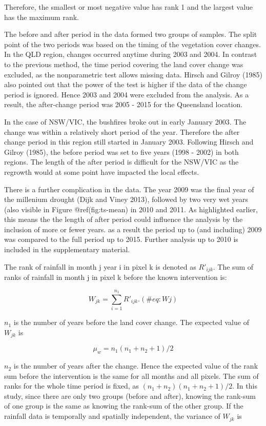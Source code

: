 \documentclass[fleqn,10pt,lineno]{wlpeerj} %
\begin{document}
\noindent Therefore, the smallest or most negative value has rank 1 and
the largest value has the maximum rank.

The before and after period in the data formed two groups of samples.
The split point of the two periods was based on the timing of the
vegetation cover changes. In the QLD region, changes occurred anytime
during 2003 and 2004. In contrast to the previous method, the time
period covering the land cover change was excluded, as the nonparametric
test allows missing data. Hirsch and Gilroy (1985) also pointed out that
the power of the test is higher if the data of the change period is
ignored. Hence 2003 and 2004 were excluded from the analysis. As a
result, the after-change period was 2005 - 2015 for the Queensland
location.

In the case of NSW/VIC, the bushfires broke out in early January 2003.
The change was within a relatively short period of the year. Therefore
the after change period in this region still started in January 2003.
Following Hirsch and Gilroy (1985), the before period was set to five
years (1998 - 2002) in both regions. The length of the after period is
difficult for the NSW/VIC as the regrowth would at some point have
impacted the local effects.

There is a further complication in the data. The year 2009 was the final
year of the millenium drought (Dijk and Viney 2013), followed by two
very wet years (also visible in Figure @ref(fig:ts-mean) in 2010 and
2011. As highlighted earlier, this means the the length of after period
could influence the analysis by the inclusion of more or fewer years. as
a result the period up to (and including) 2009 was compared to the full
period up to 2015. Further analysis up to 2010 is included in the
supplementary material.

The rank of rainfall in month j year i in pixel k is denoted as
\(R'_{ijk}\). The sum of ranks of rainfall in month j in pixel k before
the known intervention is:

\begin{equation}
  W_{jk} = \sum_{i=1}^{n_1}R'_{ijk}.
  (\#eq:Wj)
\end{equation}

\(n_1\) is the number of years before the land cover change. The
expected value of \(W_{jk}\) is

\begin{equation}
  \mu_w=n_1(n_1+n_2+1)/2
\end{equation}

\(n_2\) is the number of years after the change. Hence the expected
value of the rank sum before the intervention is the same for all months
and all pixels. The sum of ranks for the whole time period is fixed, as
\((n_1+n_2)(n_1+n_2+1)/2\). In this study, since there are only two
groups (before and after), knowing the rank-sum of one group is the same
as knowing the rank-sum of the other group. If the rainfall data is
temporally and spatially independent, the variance of \(W_{jk}\) is
\end{document}
